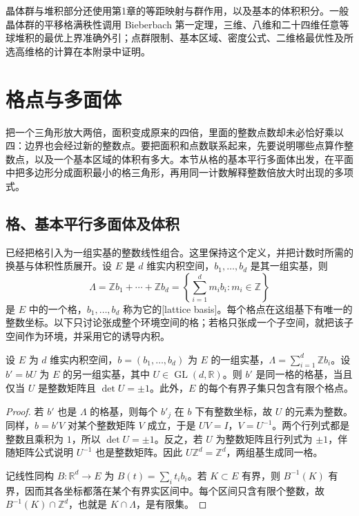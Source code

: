 \ProseParagraphBreak

晶体群与堆积部分还使用第1章的等距映射与群作用，以及基本的体积积分。一般晶体群的平移格满秩性调用 Bieberbach 第一定理，三维、八维和二十四维任意等球堆积的最优上界准确外引；点群限制、基本区域、密度公式、二维格最优性及所选高维格的计算在本附录中证明。

\section{格点与多面体}
\label{g1:sec:B01}

把一个三角形放大两倍，面积变成原来的四倍，里面的整数点数却未必恰好乘以四：边界也会经过新的整数点。要把面积和点数联系起来，先要说明哪些点算作整数点，以及一个基本区域的体积有多大。本节从格的基本平行多面体出发，在平面中把多边形分成面积最小的格三角形，再用同一计数解释整数倍放大时出现的多项式。

\subsection{格、基本平行多面体及体积}
\label{g1:subsec:B01:01}

已经把格引入为一组实基的整数线性组合。这里保持这个定义，并把计数时所需的换基与体积性质展开。设 \(E\) 是 \(d\) 维实内积空间，\(b_1,\ldots,b_d\) 是其一组实基，则
\[
	\Lambda=\mathbb Zb_1+\cdots+\mathbb Zb_d
	=\left\{\sum_{i=1}^d m_i b_i:m_i\in\mathbb Z\right\}
\]
是 \(E\) 中的一个格，\(b_1,\ldots,b_d\) 称为它的[lattice basis]。每个格点在这组基下有唯一的整数坐标。以下只讨论张成整个环境空间的格；若格只张成一个子空间，就把该子空间作为环境，并采用它的诱导内积。

\begin{proposition}
	\label{g1:prop:lattice-basis-change}
	设 \(E\) 为 \(d\) 维实内积空间，\(b=(b_1,\ldots,b_d)\) 为 \(E\) 的一组实基，\(\Lambda=\sum_{i=1}^d\mathbb Z b_i\)。设 \(b'=bU\) 为 \(E\) 的另一组实基，其中 \(U\in\operatorname{GL}(d,\mathbb R)\)。则 \(b'\) 是同一格的格基，当且仅当 \(U\) 是整数矩阵且 \(\det U=\pm1\)。此外，\(E\) 的每个有界子集只包含有限个格点。
\end{proposition}
\begin{proof}
	若 \(b'\) 也是 \(\Lambda\) 的格基，则每个 \(b'_j\) 在 \(b\) 下有整数坐标，故 \(U\) 的元素为整数。同样，\(b=b'V\) 对某个整数矩阵 \(V\) 成立，于是 \(UV=I\)，\(V=U^{-1}\)。两个行列式都是整数且乘积为 \(1\)，所以 \(\det U=\pm1\)。反之，若 \(U\) 为整数矩阵且行列式为 \(\pm1\)，伴随矩阵公式说明 \(U^{-1}\) 也是整数矩阵。因此 \(U\mathbb Z^d=\mathbb Z^d\)，两组基生成同一格。

	记线性同构 \(B:\mathbb R^d\rightarrow E\) 为 \(B(t)=\sum_i t_i b_i\)。若 \(K\subset E\) 有界，则 \(B^{-1}(K)\) 有界，因而其各坐标都落在某个有界实区间中。每个区间只含有限个整数，故 \(B^{-1}(K)\cap\mathbb Z^d\)，也就是 \(K\cap\Lambda\)，是有限集。
\end{proof}


